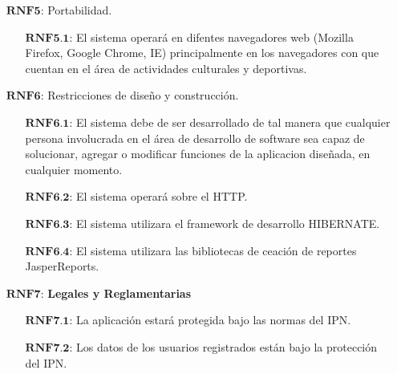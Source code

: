\begin{enumerate}
\begin{enumerate}
		\end{enumerate}
	\item[$\textbf{RNF5:}$] Portabilidad.
		\begin{enumerate}
			\item[$\textbf{RNF5.1:}$] El sistema operará en difentes navegadores web (Mozilla Firefox, Google Chrome, IE) principalmente en los navegadores con que cuentan en el área de actividades culturales y deportivas.
		\end{enumerate}
	\item[$\textbf{RNF6:}$] Restricciones de diseño y construcción.
		\begin{enumerate}
			\item[$\textbf{RNF6.1:}$] El sistema debe de ser desarrollado de tal manera que cualquier persona involucrada en el área de desarrollo de software sea capaz de solucionar, agregar o modificar funciones de la aplicacion diseñada, en cualquier momento.
			\item[$\textbf{RNF6.2:}$] El sistema operará sobre el HTTP.
			\item[$\textbf{RNF6.3:}$] El sistema utilizara el framework de desarrollo HIBERNATE.
			\item[$\textbf{RNF6.4:}$] El sistema utilizara las bibliotecas de ceación de reportes JasperReports.
		\end{enumerate}
	\item[$\textbf{RNF7:}$]\textbf{Legales y Reglamentarias}
		\begin{enumerate}
			\item[$\textbf{RNF7.1:}$] La aplicación estará protegida bajo las normas del IPN.
			\item[$\textbf{RNF7.2:}$] Los datos de los usuarios registrados están bajo la protección del IPN.
		\end{enumerate}
\end{enumerate}

